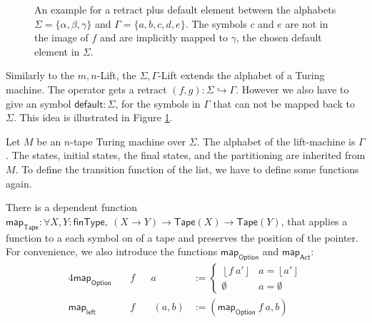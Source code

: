 \documentclass{psartcl}
\newcommand{\MS}[1]{\textsf{#1}}
\newcommand{\setOf}[1]{\bigl \{ #1 \bigr \}}
\newcommand{\from}{:}
\renewcommand{\to}{\rightarrow}
\newcommand{\Option}{\MS{Option}}
\newcommand{\Some}[1]{\left\lfloor #1\right\rfloor}
\renewcommand{\None}{\emptyset}
\newcommand{\Tape}{\MS{Tape}}
\newcommand{\Tau}{\Gamma}
\begin{document}
\begin{figure}
  \center
  \caption{An example for a retract plus default element between the alphabets $\Sigma = \setOf{\alpha, \beta, \gamma}$ and $\Tau =
    \setOf{a,b,c,d,e}$.  The symbols $c$ and $e$ are not in the image of $f$ and are implicitly mapped to $\gamma$, the chosen default element in
  $\Sigma$.}
\label{fig:sigma-tau-lift-example-mapping}
\end{figure}

Similarly to the $m,n$-Lift, the $\Sigma,\Tau$-Lift extends the alphabet of a Turing machine.  The operator gets a retract $(f,g) \from \Sigma
\hookrightarrow \Tau$.  However we also have to give an symbol $\MS{default}:\Sigma$, for the symbols in $\Tau$ that can not be mapped back to
$\Sigma$.  This idea is illustrated in Figure \ref{fig:sigma-tau-lift-example-mapping}.

Let $M$ be an $n$-tape Turing machine over $\Sigma$.  The alphabet of the lift-machine is $\Tau$.  The states, initial states, the final states, and
the partitioning are inherited from $M$.  To define the transition function of the list, we have to define some functions again.

There is a dependent function $\MS{map}_\Tape:\forall X, Y:\MS{finType},~(X \to Y) \to \Tape(X) \to \Tape(Y)$, that applies a function to a each symbol
on of a tape and preserves the position of the pointer.  For convenience, we also introduce the functions $\MS{map}_\Option$ and $\MS{map}_\MS{Act}$:
\begin{alignat*}{4}
  \MS{map}_\Option &&~ f && a &:=
    \begin{cases}
      \Some{f~a'} & a = \Some{a'} \\
      \None       & a = \None
    \end{cases} \\
    \MS{map}_\MS{left} &&~ f &&~ (a, b) &:= (\MS{map}_\Option~f~a, b)
\end{alignat*}
\end{document}
